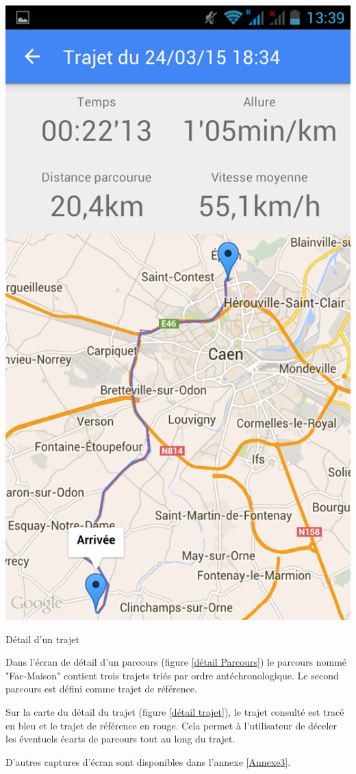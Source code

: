 \begin{multicols}{2}
\begin{img}
  \includegraphics[scale=0.35]{img/trajet.jpg}
  \caption{Détail d'un trajet}
  \label{détail trajet}
\end{img}
\end{multicols}

Dans l'écran de détail d'un parcours (figure \ref{détail Parcours}) le parcours nommé "Fac-Maison" contient trois trajets triés par ordre antéchronologique. Le second parcours est défini comme trajet de référence.\bigskip

Sur la carte du détail du trajet (figure \ref{détail trajet}), le trajet consulté est tracé en bleu et le trajet de référence en rouge. Cela permet à l'utilisateur de déceler les éventuels écarts de parcours tout au long du trajet.\bigskip

D'autres captures d'écran sont disponibles dans l'annexe \ref{Annexe3}.